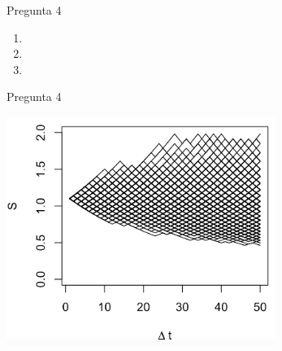 \documentclass{beamer}
\begin{document}
\begin{frame}{Pregunta 4}
\justify
\Pregcuatro
\vspace{1em}

\begin{enumerate}[label=\textbf{\alph*)}]
\item \Pregcuatroa
\item \Pregcuatrob
\item \Pregcuatroc
\end{enumerate}

\end{frame}
\begin{frame}{Pregunta 4}
  
  \includegraphics[height=20em]{../imagenes/Imagen 1.png}
\end{frame}
\end{document}
